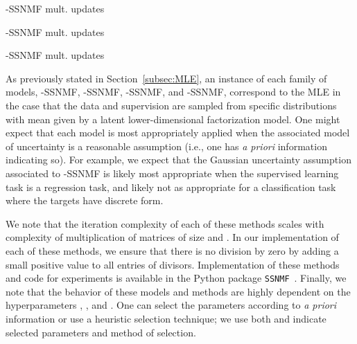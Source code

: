 \documentclass[twocolumn,10pt]{article}
\begin{document}
\begin{algorithm}[t]
    \caption{-SSNMF mult. updates}
    \label{algo:fissnmf}
    \begin{algorithmic}[1]
    \REQUIRE{, , , , }
    \FOR{}
\STATE {\;}
\STATE {\;}
\STATE {\;}
        \ENDFOR
    \end{algorithmic}
\end{algorithm}
\begin{algorithm}[t]
    \caption{-SSNMF mult. updates}
    \label{algo:ifssnmf}
    \begin{algorithmic}[1]
    \REQUIRE{, , , , }
    \FOR{}
\STATE {\;}
\STATE {\;}
\STATE {\;}
        \ENDFOR
    \end{algorithmic}
\end{algorithm}
\begin{algorithm}[ht]
    \caption{-SSNMF mult. updates}
    \label{algo:iissnmf}
    \begin{algorithmic}[1]
    \REQUIRE{, , , , }
    \FOR{}
\STATE {\;}
\STATE {\;}
\STATE {\;}
        \ENDFOR
    \end{algorithmic}
\end{algorithm}


As previously stated in Section~\ref{subsec:MLE}, an instance of each family of models, -SSNMF, -SSNMF, -SSNMF, and -SSNMF, correspond to the MLE in the case that the data  and supervision  are sampled from specific distributions with mean given by a latent lower-dimensional factorization model. One might expect that each model is most appropriately applied when the associated model of uncertainty is a reasonable assumption (i.e., one has \emph{a priori} information indicating so).
For example, we expect that the Gaussian uncertainty assumption associated to -SSNMF is likely most appropriate when the supervised learning task is a regression task, and likely not as appropriate for a classification task where the targets have discrete form.

We note that the iteration complexity of each of these methods scales with complexity of 
multiplication of matrices of size  and .  In our implementation of each of these methods, we ensure that there is no division by zero by adding a small positive value to all entries of divisors. Implementation of these methods and code for experiments is available in the Python package \texttt{SSNMF}~\cite{SSNMFpackage}.  
Finally, we note that the behavior of these models and methods are highly dependent on the hyperparameters , , and .  One can select the parameters according to \emph{a priori} information or use a heuristic 
selection technique; 
we use both and indicate selected parameters and method of selection.
\end{document}
